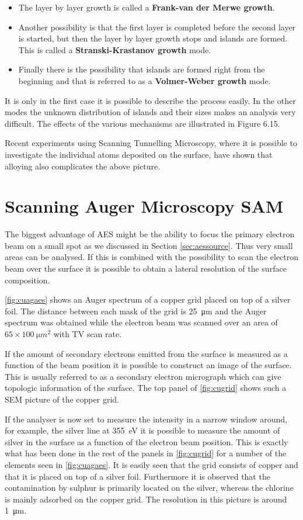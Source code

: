\begin{itemize}
\item The layer by layer growth is called a {\bf Frank-van der Merwe growth}.
\item Another possibility is that the first layer is completed before the second layer is started, but then the layer by layer growth stops and islands are formed. This is called a {\bf Stranski-Krastanov growth} mode.
\item Finally there is the possibility that islands are formed right from the beginning and that is referred to as a {\bf Volmer-Weber growth} mode.
\end{itemize}

It is only in the first case it is possible to describe the process easily. In the other modes the unknown distribution of islands and their sizes makes an analysis very difficult. The effects of the various mechanisms are illustrated in Figure 6.15.

Recent experiments using Scanning Tunnelling Microscopy, where it is possible to investigate the individual atoms deposited on the surface, have shown that alloying also complicates the above picture.

\section{Scanning Auger Microscopy SAM}
The biggest advantage of AES might be the ability to focus the primary electron beam on a small spot as we discussed in Section  \ref{sec:aessource}. Thus very small areas can be analysed. If this is combined with the possibility to scan the electron beam over the surface it is possible to obtain a lateral resolution of the surface composition.

\autoref{fig:cuagaes} shows an Auger spectrum of a copper grid placed on top of a silver foil. The distance between each mask of the grid is \SI{25}{\micro m} and the Auger spectrum was obtained while the electron beam was scanned over an area of $65\times\SI{100}{\micro m^2}$ with TV scan rate.

If the amount of secondary electrons emitted  from the surface is measured as a function of the beam position it is possible to construct an image of the surface. This is usually referred to as a secondary electron micrograph which can give topologic information of the surface. The top panel of \autoref{fig:cugrid} shows such a SEM picture of the copper grid.

If the analyser is now set to measure the intensity in a narrow window around, for example, the silver line at \SI{355}{\electronvolt} it is possible to measure the amount of silver in the surface as a function of the electron beam position. This is exactly what has been done in the rest of the panels in \autoref{fig:cugrid} for a number of the elements seen in \autoref{fig:cuagaes}. It is easily seen that the grid consists of copper and that it is placed on top of a silver foil. Furthermore it is observed that the contamination by sulphur is primarily located on the silver, whereas the chlorine is mainly adsorbed on the copper grid. The resolution in this picture is around \SI{1}{\micro m}.

